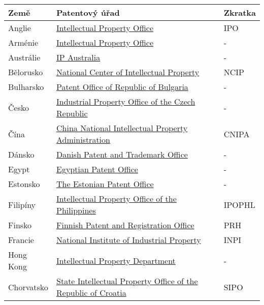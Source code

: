 	\begin{table}[H]
	\centering
	\begin{tabular}{|>{\centering\arraybackslash}p{2.2cm}|>{\centering\arraybackslash}p{8cm}|>{\centering\arraybackslash}p{2cm}|} 
	\hline
	\textbf{Země}    & \textbf{Patentový úřad} & \textbf{Zkratka}                \\ 
	\hline
	Anglie & \href{https://www.gov.uk/topic/intellectual-property}{Intellectual Property Office}  & IPO         \\ 
	\hline
	Arménie & \href{https://www.aipa.am/hy/}{Intellectual Property Office}  & -         \\ 
	\hline
	Austrálie & \href{https://www.ipaustralia.gov.au/}{IP Australia}  & -         \\ 
	\hline
	Bělorusko & \href{https://www.ncip.by/}{National Center of Intellectual Property}  & NCIP         \\ 
	\hline
	Bulharsko & \href{https://www.bpo.bg/}{Patent Office of Republic of Bulgaria}  & -         \\ 
	\hline
	Česko & \href{https://upv.gov.cz/}{Industrial Property Office of the Czech Republic}  & -         \\ 
	\hline
	Čína & \href{https://www.cnipa.gov.cn/}{China National Intellectual Property Administration}  & CNIPA         \\ 
	\hline
	Dánsko & \href{https://www.dkpto.org/}{Danish Patent and Trademark Office}  & -         \\ 
	\hline
	Egypt & \href{http://www.egypo.gov.eg}{Egyptian Patent Office}  & -         \\ 
	\hline
	Estonsko & \href{https://www.epa.ee/et}{The Estonian Patent Office}  & -         \\ 
	\hline
	Filipíny & \href{http://www.ipophil.gov.ph/}{Intellectual Property Office of the Philippines}  & IPOPHL         \\ 
	\hline
	Finsko & \href{http://www.prh.fi/en/index.html}{Finnish Patent and Registration Office}  & PRH         \\ 
	\hline
	Francie & \href{http://www.inpi.fr/}{National Institute of Industrial Property}  & INPI         \\ 
	\hline
	Hong Kong & \href{https://www.ipd.gov.hk/index.htm}{Intellectual Property Department}  & -         \\ 
	\hline
	Chorvatsko & \href{https://www.dziv.hr/}{State Intellectual Property Office of the Republic of Croatia}  & SIPO         \\ 

\end{tabular}
\end{table}

